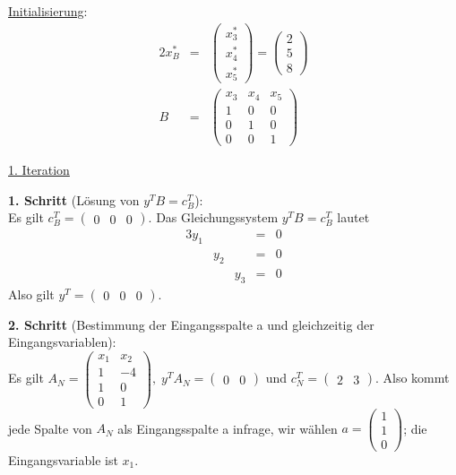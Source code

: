 \documentclass[10pt,a4paper,oneside,ngerman,numbers=noenddot]{scrartcl}
\begin{document}
		\underline{Initialisierung}:
		\begin{alignat*}{2}
			x_{B}^{*} &=& \begin{pmatrix}
				x_{3}^{*} \\
				x_{4}^{*} \\
				x_{5}^{*}
			\end{pmatrix}
			=
			\begin{pmatrix}
				2 \\
				5 \\
				8
			\end{pmatrix} \\
			B &=& \begin{pmatrix}
				x_{3} & x_{4} & x_{5} \\
				1 & 0 & 0 \\
				0 & 1 & 0 \\
				0 & 0 & 1
			\end{pmatrix}
		\end{alignat*}
		
		\underline{1. Iteration}
		
		\textbf{1. Schritt} (Lösung von $y^{T}B = c_{B}^{T}$):\\
		Es gilt $c_{B}^{T} = \begin{pmatrix} 0 & 0 & 0 \end{pmatrix}$. Das Gleichungssystem $y^{T}B = c_{B}^{T}$ lautet
		\begin{alignat*}{3}
			y_{1} & & &=& 0 \\
			& y_{2} & &=& 0 \\
			& & y_{3} &=& 0
		\end{alignat*}
		Also gilt $y^{T} = \begin{pmatrix} 0 & 0 & 0 \end{pmatrix}$.
		
		\textbf{2. Schritt} (Bestimmung der Eingangsspalte a und gleichzeitig der Eingangsvariablen):\\
		Es gilt $A_{N} = \begin{pmatrix} x_{1} & x_{2} \\ 1 & -4 \\ 1 & 0 \\ 0 & 1 \end{pmatrix},\; y^{T}A_{N} = \begin{pmatrix} 0 & 0 \end{pmatrix}$ und $c_{N}^{T} = \begin{pmatrix} 2 & 3 \end{pmatrix}$. Also kommt jede Spalte von $A_{N}$ als Eingangsspalte a infrage, wir wählen $a = \begin{pmatrix} 1 \\ 1 \\ 0 \end{pmatrix}$; die Eingangsvariable ist $x_{1}$.
		
\end{document}
